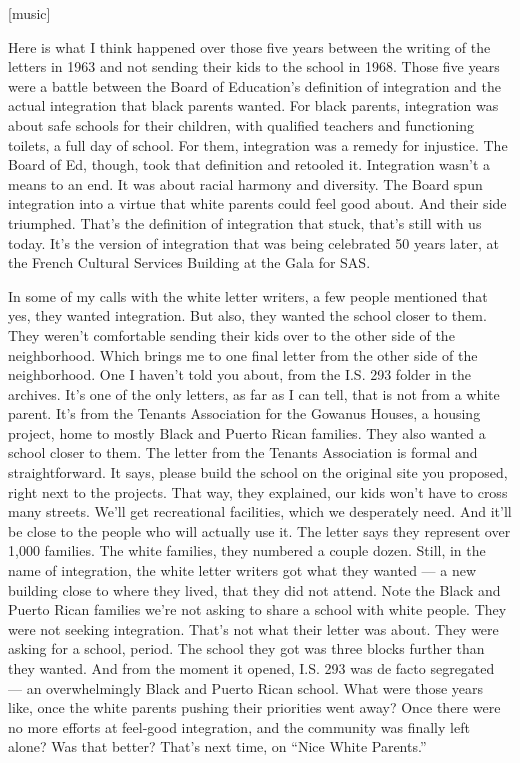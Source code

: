 {[}music{]}

Here is what I think happened over those five years between the writing
of the letters in 1963 and not sending their kids to the school in 1968.
Those five years were a battle between the Board of Education's
definition of integration and the actual integration that black parents
wanted. For black parents, integration was about safe schools for their
children, with qualified teachers and functioning toilets, a full day of
school. For them, integration was a remedy for injustice. The Board of
Ed, though, took that definition and retooled it. Integration wasn't a
means to an end. It was about racial harmony and diversity. The Board
spun integration into a virtue that white parents could feel good about.
And their side triumphed. That's the definition of integration that
stuck, that's still with us today. It's the version of integration that
was being celebrated 50 years later, at the French Cultural Services
Building at the Gala for SAS.

In some of my calls with the white letter writers, a few people
mentioned that yes, they wanted integration. But also, they wanted the
school closer to them. They weren't comfortable sending their kids over
to the other side of the neighborhood. Which brings me to one final
letter from the other side of the neighborhood. One I haven't told you
about, from the I.S. 293 folder in the archives. It's one of the only
letters, as far as I can tell, that is not from a white parent. It's
from the Tenants Association for the Gowanus Houses, a housing project,
home to mostly Black and Puerto Rican families. They also wanted a
school closer to them. The letter from the Tenants Association is formal
and straightforward. It says, please build the school on the original
site you proposed, right next to the projects. That way, they explained,
our kids won't have to cross many streets. We'll get recreational
facilities, which we desperately need. And it'll be close to the people
who will actually use it. The letter says they represent over 1,000
families. The white families, they numbered a couple dozen. Still, in
the name of integration, the white letter writers got what they wanted
--- a new building close to where they lived, that they did not attend.
Note the Black and Puerto Rican families we're not asking to share a
school with white people. They were not seeking integration. That's not
what their letter was about. They were asking for a school, period. The
school they got was three blocks further than they wanted. And from the
moment it opened, I.S. 293 was de facto segregated --- an overwhelmingly
Black and Puerto Rican school. What were those years like, once the
white parents pushing their priorities went away? Once there were no
more efforts at feel-good integration, and the community was finally
left alone? Was that better? That's next time, on ``Nice White
Parents.''

